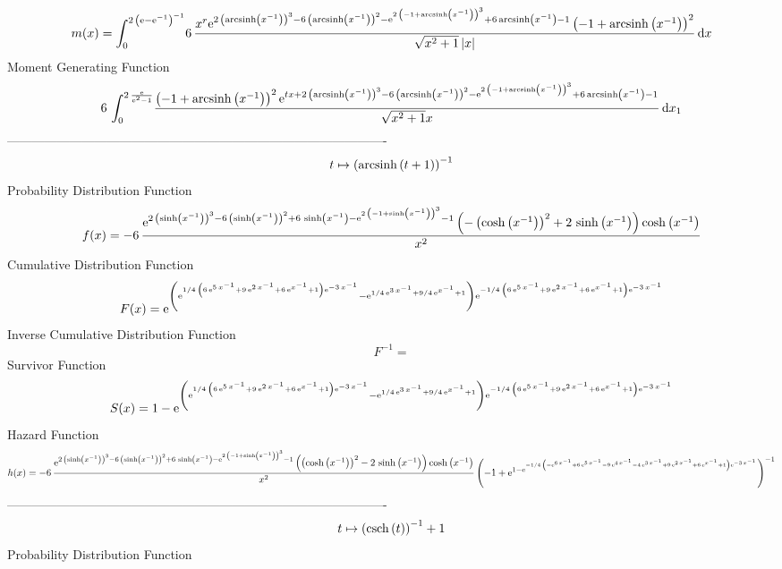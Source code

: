 \documentclass[12pt]{article}
\begin{document}
 $$ m(x) = \int_{0}^{2\, \left( {\rm e}-{{\rm e}^{-1}} \right) ^{-1}}\!6\,{\frac 
{{x}^{r}{{\rm e}^{2\, \left( {\rm arcsinh} \left({x}^{-1}\right)
 \right) ^{3}-6\, \left( {\rm arcsinh} \left({x}^{-1}\right) \right) ^
{2}-{{\rm e}^{2\, \left( -1+{\rm arcsinh} \left({x}^{-1}\right)
 \right) ^{3}}}+6\,{\rm arcsinh} \left({x}^{-1}\right)-1}} \left( -1+
{\rm arcsinh} \left({x}^{-1}\right) \right) ^{2}}{\sqrt {{x}^{2}+1}
 \left| x \right| }}\,{\rm d}x
$$ Moment Generating Function 
 $$6\,\int_{0}^{2\,{\frac {{\rm e}}{{{\rm e}^{2}}-1}}}\!{\frac { \left( -
1+{\rm arcsinh} \left({x}^{-1}\right) \right) ^{2}{{\rm e}^{tx+2\,
 \left( {\rm arcsinh} \left({x}^{-1}\right) \right) ^{3}-6\, \left( 
{\rm arcsinh} \left({x}^{-1}\right) \right) ^{2}-{{\rm e}^{2\, \left( 
-1+{\rm arcsinh} \left({x}^{-1}\right) \right) ^{3}}}+6\,{\rm arcsinh}
 \left({x}^{-1}\right)-1}}}{\sqrt {{x}^{2}+1}x}}\,{\rm d}x_{{1}}
$$-------------------------------------------------------------------------------------------  \\$$t\mapsto  \left( {\rm arcsinh} \left(t+1\right) \right) ^{-1}
$$Probability Distribution Function 
$$  f(x)=-6\,{\frac {{{\rm e}^{2\, \left( \sinh \left( {x}^{-1} \right) 
 \right) ^{3}-6\, \left( \sinh \left( {x}^{-1} \right)  \right) ^{2}+6
\,\sinh \left( {x}^{-1} \right) -{{\rm e}^{2\, \left( -1+\sinh \left( 
{x}^{-1} \right)  \right) ^{3}}}-1}} \left( - \left( \cosh \left( {x}^
{-1} \right)  \right) ^{2}+2\,\sinh \left( {x}^{-1} \right)  \right) 
\cosh \left( {x}^{-1} \right) }{{x}^{2}}}
$$Cumulative Distribution Function  
 $$F(x)={{\rm e}^{ \left( {{\rm e}^{1/4\, \left( 6\,{{\rm e}^{5\,{x}^{-1}}}+9
\,{{\rm e}^{2\,{x}^{-1}}}+6\,{{\rm e}^{{x}^{-1}}}+1 \right) {{\rm e}^{
-3\,{x}^{-1}}}}}-{{\rm e}^{1/4\,{{\rm e}^{3\,{x}^{-1}}}+9/4\,{{\rm e}^
{{x}^{-1}}}+1}} \right) {{\rm e}^{-1/4\, \left( 6\,{{\rm e}^{5\,{x}^{-
1}}}+9\,{{\rm e}^{2\,{x}^{-1}}}+6\,{{\rm e}^{{x}^{-1}}}+1 \right) {
{\rm e}^{-3\,{x}^{-1}}}}}}}
$$ Inverse Cumulative Distribution Function 
  $$F^{-1} = 
$$Survivor Function 
 $$ S(x)=1-{{\rm e}^{ \left( {{\rm e}^{1/4\, \left( 6\,{{\rm e}^{5\,{x}^{-1}}}+
9\,{{\rm e}^{2\,{x}^{-1}}}+6\,{{\rm e}^{{x}^{-1}}}+1 \right) {{\rm e}^
{-3\,{x}^{-1}}}}}-{{\rm e}^{1/4\,{{\rm e}^{3\,{x}^{-1}}}+9/4\,{{\rm e}
^{{x}^{-1}}}+1}} \right) {{\rm e}^{-1/4\, \left( 6\,{{\rm e}^{5\,{x}^{
-1}}}+9\,{{\rm e}^{2\,{x}^{-1}}}+6\,{{\rm e}^{{x}^{-1}}}+1 \right) {
{\rm e}^{-3\,{x}^{-1}}}}}}}
$$ Hazard Function 
 $$ h(x)=-6\,{\frac {{{\rm e}^{2\, \left( \sinh \left( {x}^{-1} \right) 
 \right) ^{3}-6\, \left( \sinh \left( {x}^{-1} \right)  \right) ^{2}+6
\,\sinh \left( {x}^{-1} \right) -{{\rm e}^{2\, \left( -1+\sinh \left( 
{x}^{-1} \right)  \right) ^{3}}}-1}} \left(  \left( \cosh \left( {x}^{
-1} \right)  \right) ^{2}-2\,\sinh \left( {x}^{-1} \right)  \right) 
\cosh \left( {x}^{-1} \right) }{{x}^{2}} \left( -1+{{\rm e}^{1-{
{\rm e}^{-1/4\, \left( -{{\rm e}^{6\,{x}^{-1}}}+6\,{{\rm e}^{5\,{x}^{-
1}}}-9\,{{\rm e}^{4\,{x}^{-1}}}-4\,{{\rm e}^{3\,{x}^{-1}}}+9\,{{\rm e}
^{2\,{x}^{-1}}}+6\,{{\rm e}^{{x}^{-1}}}+1 \right) {{\rm e}^{-3\,{x}^{-
1}}}}}}} \right) ^{-1}}
$$-------------------------------------------------------------------------------------------  \\$$t\mapsto  \left( {\rm csch} \left(t\right) \right) ^{-1}+1
$$Probability Distribution Function 
\end{document}
